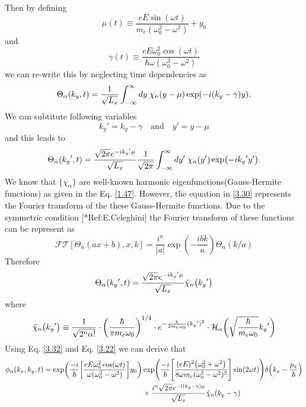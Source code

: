 Then by defining
\begin{equation} \label{3.26}
  \mu(t) \equiv \frac{eE\sin(\omega t)}{m_e(\omega_0^2 - \omega^2)} + y_0
\end{equation}
and
\begin{equation} \label{3.27}
  \gamma(t) \equiv
  \frac{eE\omega_0^2\cos(\omega t)}{\hbar\omega(\omega_0^2 - \omega^2)}
\end{equation}
we can re-write this by neglecting time dependencies as
\begin{equation} \label{3.28}
  \Theta_{\alpha}(k_y,t) =
  \frac{1}{\sqrt{L_x}}
  \int_{-\infty}^{\infty} dy\;
  \chi_{n}\qty(y - \mu )
  \exp(
    -i\qty(k_y - \gamma)
    y).
\end{equation}
We can subtitute following variables
\begin{equation} \label{3.29}
  {k_y}' = k_y -\gamma \quad \text{and} \quad y' = y -\mu
\end{equation}
and this leads to
\begin{equation} \label{3.30}
  \Theta_{\alpha}({k_y}' ,t) =
  \frac{\sqrt{2\pi}e^{-i {k_y}'\mu}}{\sqrt{L_x}}
  \frac{1}{\sqrt{2\pi}}
  \int_{-\infty}^{\infty} dy'\;
  \chi_{n}\qty(y')
  \exp(-i{k_y}' y').
\end{equation}
We know that $\{\chi_{\alpha}\}$ are well-known harmonic eigenfunctions(Gauss-Hermite functions) as given in the Eq. \eqref{1.47}. However, the equation in \eqref{3.30} represents the Fourier transform of the these Gauss-Hermite functions. Due to the symmetric condition [*Ref:E.Celeghini] the Fourier transform of these functions can be represent as
\begin{equation} \label{3.31}
  \mathcal{FT}[\Theta_n(ax+b),x,k] = \frac{i^n}{|a|}\exp(-\frac{ibk}{a})\Theta_n(k/a)
\end{equation}
Therefore
\begin{equation} \label{3.32}
  \Theta_{\alpha}({k_y}' ,t) =
  \frac{\sqrt{2\pi}e^{-i {k_y}'\mu}}{\sqrt{L_x}}
  \tilde{\chi}_{n}\qty({k_y}')
\end{equation}
where
\begin{equation} \label{3.33}
  \tilde{\chi}_{n}\qty({k_y}') \equiv
  \frac{1}{\sqrt{2^{n}{\alpha}!}}  \cdot
  \bigg(\frac{\hbar}{\pi m_e\omega_0}\bigg)^{1/4}
  \cdot e^{-\frac{\hbar}{2 m_e\omega_0 } ({k_y}')^2} \cdot
  \mathcal{H}_{\alpha} \bigg(\sqrt{\frac{\hbar}{m_e \omega_0}}{k_y}'\bigg)
\end{equation}
Using Eq. \eqref{3.32} and Eq. \eqref{3.22} we can derive that
\begin{equation} \label{3.34}
  \begin{aligned}
    \phi_{\alpha}(k_x,k_y,t)  =
    \exp(
      \frac{-i}{\hbar}
      \qty[
      \frac{eE\omega_0^2\cos(\omega t)}{\omega(\omega_0^2 - \omega^2)}]y_0
    )&
    \exp(
      \frac{-i}{\hbar}
      \qty[
      \frac{(eE)^2\qty(\omega_0^2 + \omega^2)}{8\omega m_e(\omega_0^2 - \omega^2)^2}
      ]\sin(2\omega t)
    )
    \delta\qty(k_x -\frac{p_x}{\hbar})
    \\
    & \times
    \frac{i^n\sqrt{2\pi}e^{-i \qty(k_y -\gamma)\mu}}{\sqrt{L_x}}
    \tilde{\chi}_{n}\qty(k_y -\gamma)
  \end{aligned}
\end{equation}
